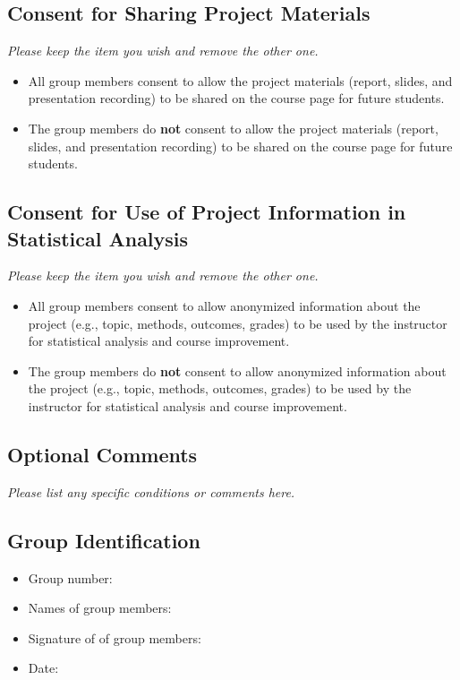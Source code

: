 \documentclass{article}
\begin{document}
\subsection*{Consent for Sharing Project Materials}
\textit{Please keep the item you wish and remove the other one.}

\begin{itemize}
	\item All group members consent to allow the project materials (report, slides, and presentation recording) to be shared on the course page for future students.
	\item The group members do \textbf{not} consent to allow the project materials (report, slides, and presentation recording) to be shared on the course page for future students.
\end{itemize}

\subsection*{Consent for Use of Project Information in Statistical Analysis}
\textit{Please keep the item you wish and remove the other one.}
\begin{itemize}
	\item All group members consent to allow anonymized information about the project (e.g., topic, methods, outcomes, grades) to be used by the instructor for statistical analysis and course improvement.
	\item The group members do \textbf{not} consent to allow anonymized information about the project (e.g., topic, methods, outcomes, grades) to be used by the instructor for statistical analysis and course improvement.
\end{itemize}

\subsection*{Optional Comments}
\textit{Please list any specific conditions or comments here.}

\subsection*{Group Identification}

\begin{itemize}
	\item Group number:
	\item Names of group members: 
	\item Signature of of group members: 
	\item Date: 
\end{itemize}
\end{document}
